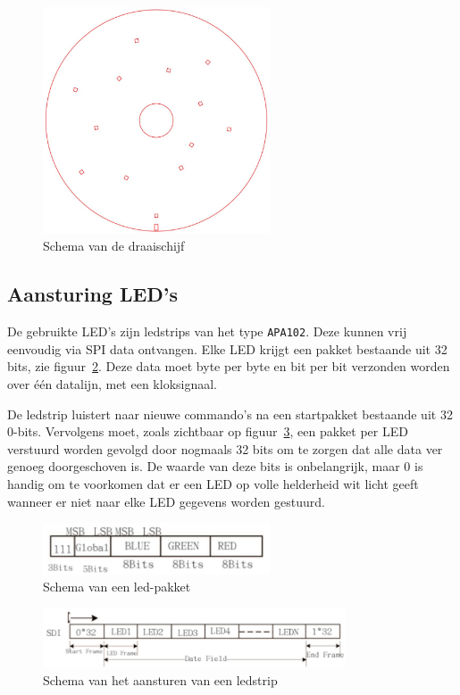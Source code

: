 \documentclass[12pt]{ugentreport}
\begin{document}
\begin{figure}
  \centering
  \includegraphics[width=0.6\textwidth]{img/schijf.jpg}
  \caption{Schema van de draaischijf}
  \label{fig:schijf}
\end{figure}

\subsection{Aansturing LED's}
De gebruikte LED's zijn ledstrips van het type \texttt{APA102}.
Deze kunnen vrij eenvoudig via SPI data ontvangen.
Elke LED krijgt een pakket bestaande uit 32 bits, zie
figuur~\ref{fig:ledpakket}.
Deze data moet byte per byte en bit per bit verzonden worden over één datalijn,
met een kloksignaal.

De ledstrip luistert naar nieuwe commando's na een startpakket
bestaande uit 32 0-bits. Vervolgens moet,
zoals zichtbaar op figuur~\ref{fig:ledcontrol},
een pakket per LED verstuurd worden gevolgd door
nogmaals 32 bits om te zorgen dat alle data ver genoeg doorgeschoven is.
De waarde van deze bits is onbelangrijk,
maar 0 is handig om te voorkomen dat er een LED op volle helderheid wit licht
geeft wanneer er niet naar elke LED gegevens worden gestuurd.

\begin{figure}
  \centering
  \includegraphics[width=0.6\textwidth]{img/ledpakket.png}
  \caption{Schema van een led-pakket}
  \label{fig:ledpakket}
\end{figure}

\begin{figure}
  \centering
  \includegraphics[width=0.8\textwidth]{img/ledcontrol.png}
  \caption{Schema van het aansturen van een ledstrip}
  \label{fig:ledcontrol}
\end{figure}
\end{document}
